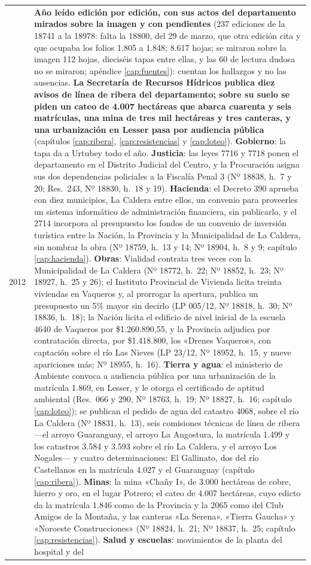 \begin{longtable}{@{}p{2.7cm}p{10.3cm}@{}}
2012 & \textbf{Año leído edición por edición, con sus actos del departamento mirados sobre la imagen y con pendientes} (237 ediciones de la 18741 a la 18978: falta la 18800, del 29 de marzo, que otra edición cita y que ocupaba los folios 1.805 a 1.848; 8.617 hojas; se miraron sobre la imagen 112 hojas, dieciséis tapas entre ellas, y las 60 de lectura dudosa no se miraron; apéndice \ref{cap:fuentes}): cuentan los hallazgos y no las ausencias. \textbf{La Secretaría de Recursos Hídricos publica diez avisos de línea de ribera del departamento; sobre su suelo se piden un cateo de 4.007 hectáreas que abarca cuarenta y seis matrículas, una mina de tres mil hectáreas y tres canteras, y una urbanización en Lesser pasa por audiencia pública} (capítulos \ref{cap:ribera}, \ref{cap:resistencias} y \ref{cap:loteo}). \textbf{Gobierno}: la tapa da a Urtubey todo el año. \textbf{Justicia}: las leyes 7716 y 7718 ponen el departamento en el Distrito Judicial del Centro, y la Procuración asigna sus dos dependencias policiales a la Fiscalía Penal 3 (Nº 18838, h.\ 7 y 20; Res.\ 243, Nº 18830, h.\ 18 y 19). \textbf{Hacienda}: el Decreto 390 aprueba con diez municipios, La Caldera entre ellos, un convenio para proveerles un sistema informático de administración financiera, sin publicarlo, y el 2714 incorpora al presupuesto los fondos de un convenio de inversión turística entre la Nación, la Provincia y la Municipalidad de La Caldera, sin nombrar la obra (Nº 18759, h.\ 13 y 14; Nº 18904, h.\ 8 y 9; capítulo \ref{cap:hacienda}). \textbf{Obras}: Vialidad contrata tres veces con la Municipalidad de La Caldera (Nº 18772, h.\ 22; Nº 18852, h.\ 23; Nº 18927, h.\ 25 y 26); el Instituto Provincial de Vivienda licita treinta viviendas en Vaqueros y, al prorrogar la apertura, publica un presupuesto un 5\% mayor sin decirlo (LP 005/12, Nº 18818, h.\ 30; Nº 18836, h.\ 18); la Nación licita el edificio de nivel inicial de la escuela 4640 de Vaqueros por \$1.260.890,55, y la Provincia adjudica por contratación directa, por \$1.418.800, los «Drenes Vaqueros», con captación sobre el río Las Nieves (LP 23/12, Nº 18952, h.\ 15, y nueve apariciones más; Nº 18955, h.\ 16). \textbf{Tierra y agua}: el ministerio de Ambiente convoca a audiencia pública por una urbanización de la matrícula 1.869, en Lesser, y le otorga el certificado de aptitud ambiental (Res.\ 066 y 290, Nº 18763, h.\ 19; Nº 18827, h.\ 16; capítulo \ref{cap:loteo}); se publican el pedido de agua del catastro 4068, sobre el río La Caldera (Nº 18831, h.\ 13), seis comisiones técnicas de línea de ribera ---el arroyo Guaranguay, el arroyo La Angostura, la matrícula 1.499 y los catastros 3.584 y 3.593 sobre el río La Caldera, y el arroyo Los Nogales--- y cuatro determinaciones: El Gallinato, dos del río Castellanos en la matrícula 4.027 y el Guaranguay (capítulo \ref{cap:ribera}). \textbf{Minas}: la mina «Chañy I», de 3.000 hectáreas de cobre, hierro y oro, en el lugar Potrero; el cateo de 4.007 hectáreas, cuyo edicto da la matrícula 1.846 como de la Provincia y la 2065 como del Club Amigos de la Montaña, y las canteras «La Serena», «Tierra Gaucha» y «Noroeste Construcciones» (Nº 18824, h.\ 21; Nº 18837, h.\ 25; capítulo \ref{cap:resistencias}). \textbf{Salud y escuelas}: movimientos de la planta del hospital y del 
\end{longtable}
